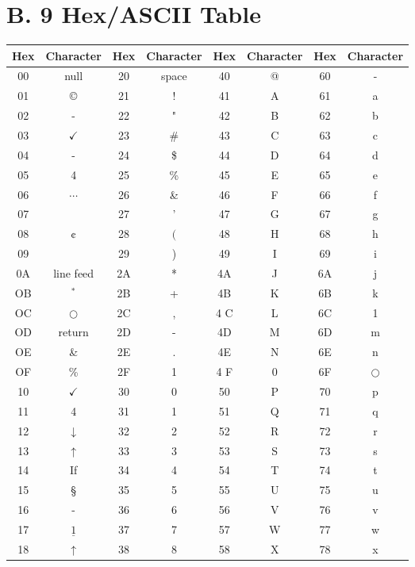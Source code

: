 \documentclass[10pt]{article}
\begin{document}
\section*{B. 9 Hex/ASCII Table}
\begin{center}
\begin{tabular}{|c|c|c|c|c|c|c|c|}
\hline
Hex & Character & Hex & Character & Hex & Character & Hex & Character \\
\hline
00 & null & 20 & space & 40 & @ & 60 & - \\
\hline
01 & © & 21 & ! & 41 & A & 61 & a \\
\hline
02 & - & 22 & " & 42 & B & 62 & b \\
\hline
03 & $\checkmark$ & 23 & \# & 43 & C & 63 & c \\
\hline
04 & - & 24 & \$ & 44 & D & 64 & d \\
\hline
05 & 4 & 25 & \% & 45 & E & 65 & e \\
\hline
06 & $\cdots$ & 26 & \& & 46 & F & 66 & f \\
\hline
07 &  & 27 & ' & 47 & G & 67 & g \\
\hline
08 & ¢ & 28 & $($ & 48 & H & 68 & h \\
\hline
09 &  & 29 & ) & 49 & I & 69 & i \\
\hline
0A & line feed & 2A & * & 4A & J & 6A & j \\
\hline
OB & ${ }^{*}$ & 2B & + & 4B & K & 6B & k \\
\hline
OC & $\bigcirc$ & 2C & , & 4 C & L & 6C & 1 \\
\hline
OD & return & 2D & - & 4D & M & 6D & m \\
\hline
OE & \& & 2E & . & 4E & N & 6E & n \\
\hline
OF & \% & 2F & 1 & 4 F & 0 & 6F & $\bigcirc$ \\
\hline
10 & $\checkmark$ & 30 & 0 & 50 & P & 70 & p \\
\hline
11 & 4 & 31 & 1 & 51 & Q & 71 & q \\
\hline
12 & $\downarrow$ & 32 & 2 & 52 & R & 72 & r \\
\hline
13 & $\uparrow$ & 33 & 3 & 53 & S & 73 & s \\
\hline
14 & If & 34 & 4 & 54 & T & 74 & t \\
\hline
15 & § & 35 & 5 & 55 & U & 75 & u \\
\hline
16 & - & 36 & 6 & 56 & V & 76 & v \\
\hline
17 & $\underline{1}$ & 37 & 7 & 57 & W & 77 & w \\
\hline
18 & $\uparrow$ & 38 & 8 & 58 & X & 78 & x \\

\end{tabular}
\end{center}
\end{document}
